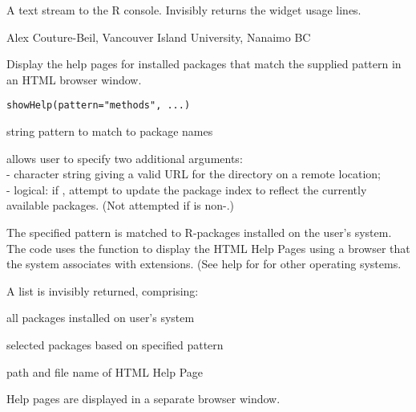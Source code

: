 \documentclass[letterpaper]{book}
\begin{document}
%
\begin{Value}
A text stream to the R console. Invisibly returns the widget usage lines.
\end{Value}
%
\begin{Author}\relax
Alex Couture-Beil, Vancouver Island University, Nanaimo BC
\end{Author}
%
\begin{Description}\relax
Display the help pages for installed packages that match the 
supplied pattern in an HTML browser window.
\end{Description}
%
\begin{Usage}
\begin{verbatim}
showHelp(pattern="methods", ...)
\end{verbatim}
\end{Usage}
%
\begin{Arguments}
\begin{ldescription}
\item[\code{pattern}] string pattern to match to package names
\item[\code{...}] allows user to specify two additional arguments: \\{}
 - character string giving a valid URL for the 
directory on a remote location; \\{}
 - logical: if , attempt to update the package
index to reflect the currently available packages. 
(Not attempted if  is non-.) 
\end{ldescription}
\end{Arguments}
%
\begin{Details}\relax
The specified pattern is matched to R-packages installed on 
the user's system. The code uses the  
function  to display the HTML Help Pages using 
a browser that the system associates with  
extensions. (See help for  for other operating systems.
\end{Details}
%
\begin{Value}
A list is invisibly returned, comprising:
\begin{ldescription}
\item[\code{Apacks}] all packages installed on user's system
\item[\code{Spacks}] selected packages based on specified pattern
\item[\code{URLs}] path and file name of HTML Help Page
\end{ldescription}
Help pages are displayed in a separate browser window.
\end{Value}
\end{document}
